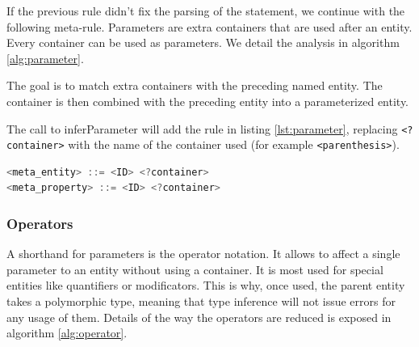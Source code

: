 \documentclass[11pt,a4paper,twoside,openright,titlepage,numbers=noenddot,headinclude,cleardoublepage=empty,openany]{scrreprt}
\theoremstyle{plain}
\theoremstyle{definition}
\theoremstyle{remark}
\newcommand{\algorithmicbreak}{\textbf{break}}
\newcommand{\Break}{\State \algorithmicbreak}\newcommand{\algorithmiccontinue}{\textbf{continue}}
\newcommand{\passthrough}[1]{#1}
\begin{document}
If the previous rule didn't fix the parsing of the statement, we
continue with the following meta-rule. Parameters are extra containers
that are used after an entity. Every container can be used as
parameters. We detail the analysis in algorithm \ref{alg:parameter}.


The goal is to match extra containers with the preceding named entity.
The container is then combined with the preceding entity into a
parameterized entity.

The call to inferParameter will add the rule in
listing \ref{lst:parameter}, replacing
\passthrough{\lstinline!<?container>!} with the name of the container
used (for example \passthrough{\lstinline!<parenthesis>!}).

\begin{lstlisting}[language=Java, caption={Rules added to the current grammar for handling parameters}, escapechar={$}, label=lst:parameter]
<meta_entity> ::= <ID> <?container>
<meta_property> ::= <ID> <?container>
\end{lstlisting}

\hypertarget{operators}{%
\subsubsection{Operators}\label{operators}}

A shorthand for parameters is the operator notation. It allows to affect
a single parameter to an entity without using a container. It is most
used for special entities like quantifiers or modificators. This is why,
once used, the parent entity takes a polymorphic type, meaning that type
inference will not issue errors for any usage of them. Details of the
way the operators are reduced is exposed in
algorithm \ref{alg:operator}.
\end{document}
